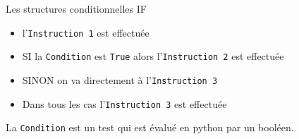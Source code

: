 \begin{easybox}{Les structures conditionnelles IF}
\begin{minipage}{0.65\linewidth}
	
	\begin{itemize}
		\item l'\verb+Instruction 1+ est effectuée
		\item SI la \verb+Condition+ est \verb+True+ alors l'\verb+Instruction 2+ est effectuée
		\item SINON on va directement à l'\verb+Instruction 3+
		\item Dans tous les cas l'\verb+Instruction 3+ est effectuée
	\end{itemize}
	
	La \verb+Condition+ est un test qui est évalué en python par un booléen.
	
	\end{minipage}

\end{easybox}


\medskip


